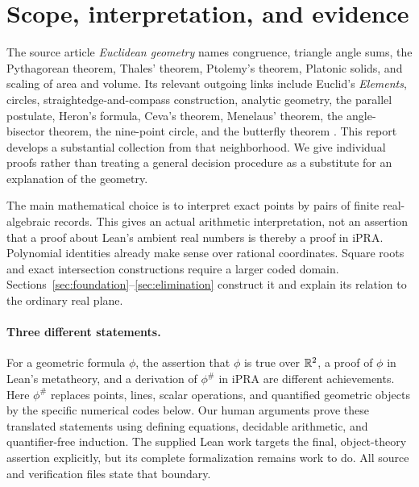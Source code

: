 \section{Scope, interpretation, and evidence}
\label{sec:scope}
The source article \emph{Euclidean geometry} names congruence, triangle
angle sums, the Pythagorean theorem, Thales' theorem, Ptolemy's theorem,
Platonic solids, and scaling of area and volume. Its relevant outgoing
links include Euclid's \emph{Elements}, circles, straightedge-and-compass
construction, analytic geometry, the parallel postulate, Heron's formula,
Ceva's theorem, Menelaus' theorem, the angle-bisector theorem, the
nine-point circle, and the butterfly theorem \cite{wiki}.
This report develops a substantial collection from that neighborhood.
We give individual proofs rather than treating a general decision procedure
as a substitute for an explanation of the geometry.

The main mathematical choice is to interpret exact points by pairs of
finite real-algebraic records. This gives an actual arithmetic interpretation,
not an assertion that a proof about Lean's ambient real numbers is thereby
a proof in iPRA. Polynomial identities already make sense over rational
coordinates. Square roots and exact intersection constructions require a
larger coded domain. Sections~\ref{sec:foundation}--\ref{sec:elimination}
construct it and explain its relation to the ordinary real plane.

\paragraph{Three different statements.}
For a geometric formula $\phi$, the assertion that $\phi$ is true over
$\mathbb R^2$, a proof of $\phi$ in Lean's metatheory, and a derivation of
$\phi^\#$ in iPRA are different achievements. Here $\phi^\#$ replaces
points, lines, scalar operations, and quantified geometric objects by the
specific numerical codes below. Our human arguments prove these translated
statements using defining equations, decidable arithmetic, and
quantifier-free induction. The supplied Lean work targets the final,
object-theory assertion explicitly, but its complete formalization remains
work to do. All source and verification files state that boundary.

